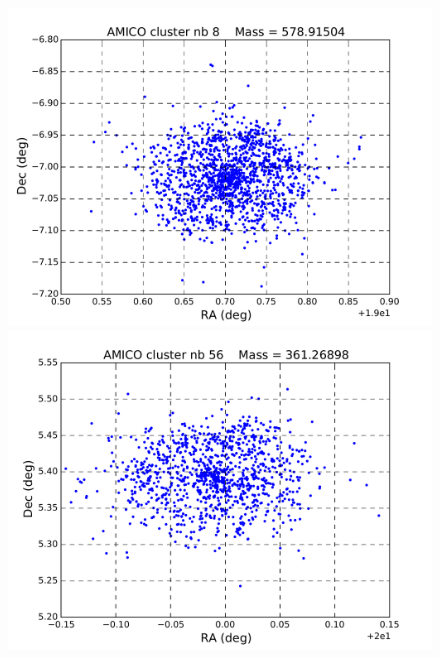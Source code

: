 \documentclass[a4paper,11pt]{article}
\numberwithin{equation}{section}
\begin{document}
    \vspace{-10pt}
    \begin{figure}[H]
      \begin{minipage}[t]{0.48\textwidth}
      \includegraphics[width=\linewidth]{8.pdf}
  	  \end{minipage}
	  \hfill
    \begin{minipage}[t]{0.48\textwidth}

      \includegraphics[width=\linewidth]{56.pdf}
  	\end{minipage}
  	
  	\vspace{-5pt}
  	

\end{figure}
\end{document}

